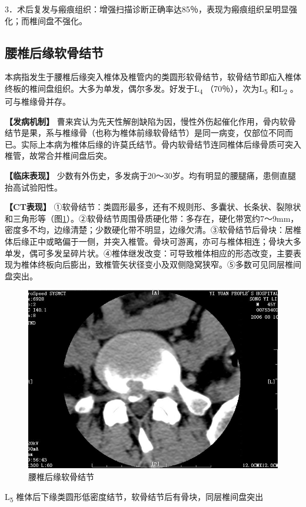 3．术后复发与瘢痕组织：增强扫描诊断正确率达85％，表现为瘢痕组织呈明显强化；而椎间盘不强化。

\subsection{腰椎后缘软骨结节}

本病指发生于腰椎后缘突入椎体及椎管内的类圆形软骨结节，软骨结节即疝入椎体终板的椎间盘组织。大多为单发，偶尔多发。好发于L\textsubscript{4}
（70％），次为L\textsubscript{5} 和L\textsubscript{2} 。可与椎缘骨并存。

\textbf{【发病机制】}
曹来宾认为先天性解剖缺陷为因，慢性外伤起催化作用，骨内软骨结节是果，系与椎缘骨（也称为椎体前缘软骨结节）是同一病变，仅部位不同而已。实际上本病为椎体后缘的许莫氏结节。骨内软骨结节连同椎体后缘骨质可突入椎管，故常合并椎间盘后突。

\textbf{【临床表现】}
少数有外伤史，多发病于20～30岁。均有明显的腰腿痛，患侧直腿抬高试验阳性。

\textbf{【CT表现】}
①软骨结节：类圆形最多，还有不规则形、多囊状、长条状、裂隙状和三角形等（图\ref{fig23-8}）。②软骨结节周围骨质硬化带：多存在，硬化带宽约7～9mm，密度多不均，边缘清楚；少数硬化带不明显，边缘欠清。③软骨结节后骨块：居椎体后缘正中或略偏于一侧，并突入椎管。骨块可游离，亦可与椎体相连；骨块大多单发，偶可多发呈碎片状。④椎体继发改变：可导致椎体相应的形态改变，主要表现为椎体终板向后膨出，致椎管矢状径变小及双侧隐窝狭窄。⑤多数可见同层椎间盘突出。

\begin{figure}[!htbp]
 \centering
 \includegraphics[width=.7\textwidth,height=\textheight,keepaspectratio]{./images/Image00471.jpg}
 \captionsetup{justification=centering}
 \caption{腰椎后缘软骨结节}
 \label{fig23-8}
  \end{figure} 

L\textsubscript{5}
椎体后下缘类圆形低密度结节，软骨结节后有骨块，同层椎间盘突出


